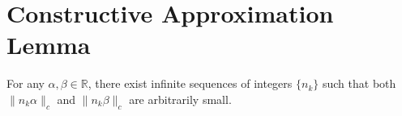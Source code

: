 
\section{Constructive Approximation Lemma}
For any \( \alpha, \beta \in \mathbb{R} \), there exist infinite sequences of integers \( \{n_k\} \)
such that both \( \|n_k\alpha\|_c \) and \( \|n_k\beta\|_c \) are arbitrarily small.
